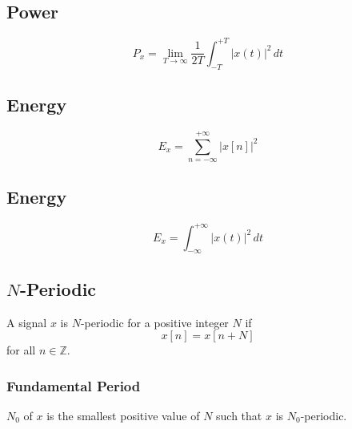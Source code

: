 \documentclass{article}
\begin{document}
\begin{paracol}{2}
\switchcolumn[1] %
\subsection{Power}
\begin{definition}
    \begin{equation*}
        P_x = \lim_{T \to \infty} \frac{1}{2T} \int_{-T}^{+T} |x(t)|^2 \, dt
    \end{equation*}
\end{definition}

\switchcolumn[0] %
\subsection{Energy}
\begin{definition}
    \begin{equation*}
        E_x = \sum_{n=-\infty}^{+\infty} |x[n]|^2
    \end{equation*}
\end{definition}

\switchcolumn[1] %
\subsection{Energy}
\begin{definition}
    \begin{equation*}
        E_x = \int_{-\infty}^{+\infty} |x(t)|^2 \, dt
    \end{equation*}
\end{definition}

\switchcolumn[0]
\subsection{\( N \)-Periodic}
\begin{definition}
    A signal \( x \) is \( N \)-periodic for a positive integer \( N \) if
    \begin{equation*}
        x[n] = x[n + N]
    \end{equation*}
    for all \( n \in \mathbb{Z} \).
\end{definition}

\subsubsection{Fundamental Period}
\begin{definition}
    \( N_0 \) of \( x \) is the smallest positive value of \( N \) such that \( x \) is \( N_0 \)-periodic.
\end{definition}


\end{paracol}
\end{document}
